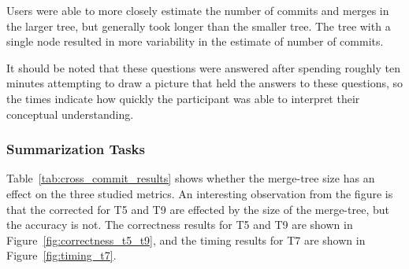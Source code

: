 Users were able to more closely estimate the number of commits and
merges in the larger tree, but generally took longer than the smaller
tree. The tree with a single node resulted in more variability in the
estimate of number of commits.

It should be noted that these questions were answered after spending
roughly ten minutes attempting to draw a picture that held the answers
to these questions, so the times indicate how quickly the participant
was able to interpret their conceptual understanding.

\subsubsection{Summarization Tasks}
\label{sub:summarization_tasks}

Table~\ref{tab:cross_commit_results} shows whether the merge-tree size
has an effect on the three studied metrics. An interesting observation
from the figure is that the corrected for T5 and T9 are effected by the
size of the merge-tree, but the accuracy is not. The correctness results
for T5 and T9 are shown in Figure~\ref{fig:correctness_t5_t9}, and the
timing results for T7 are shown in Figure~\ref{fig:timing_t7}.

